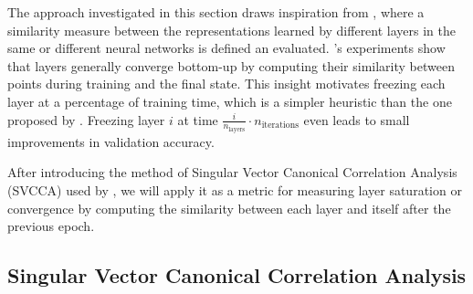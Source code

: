 The approach investigated in this section draws inspiration from
\citep{raghu2017svcca}, where a similarity measure between the representations
learned by different layers in the same or different neural networks is defined
an evaluated. \citeauthor{raghu2017svcca}'s experiments show that layers
generally converge bottom-up by computing their similarity between points during
training and the final state. This insight motivates freezing each layer at a
percentage of training time, which is a simpler heuristic than the one proposed
by \citeauthor{brock2017freezeout}. Freezing layer $i$ at time
$\frac{i}{n_\text{layers}} \cdot n_\text{iterations}$ even leads to small improvements
in validation accuracy.

After introducing the method of Singular Vector Canonical Correlation Analysis
(SVCCA) used by \citeauthor{raghu2017svcca}, we will apply it as a metric for
measuring layer saturation or convergence by computing the similarity between
each layer and itself after the previous epoch.

\subsection{Singular Vector Canonical Correlation Analysis}%
\label{sub:singular_vector_canonical_correlation_analysis}

